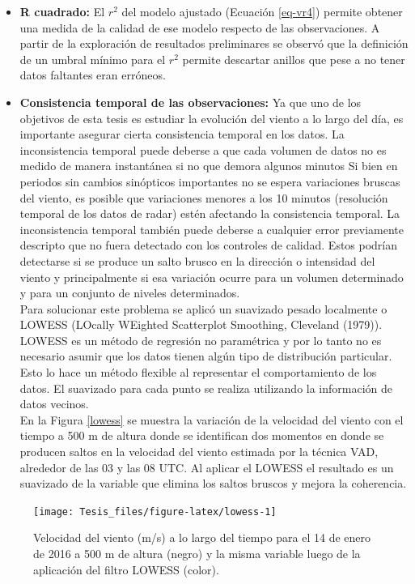 \documentclass[12pt,spanish,oneside, a4paper]{book}
\begin{document}
\begin{itemize}
\item
  \textbf{R cuadrado:} El \(r^2\) del modelo ajustado (Ecuación
  \ref{eq-vr4}) permite obtener una medida de la calidad de ese modelo
  respecto de las observaciones. A partir de la exploración de
  resultados preliminares se observó que la definición de un umbral
  mínimo para el \(r^2\) permite descartar anillos que pese a no tener
  datos faltantes eran erróneos.
\item
  \textbf{Consistencia temporal de las observaciones:} Ya que uno de los
  objetivos de esta tesis es estudiar la evolución del viento a lo largo
  del día, es importante asegurar cierta consistencia temporal en los
  datos. La inconsistencia temporal puede deberse a que cada volumen de
  datos no es medido de manera instantánea si no que demora algunos
  minutos Si bien en periodos sin cambios sinópticos importantes no se
  espera variaciones bruscas del viento, es posible que variaciones
  menores a los 10 minutos (resolución temporal de los datos de radar)
  estén afectando la consistencia temporal. La inconsistencia temporal
  también puede deberse a cualquier error previamente descripto que no
  fuera detectado con los controles de calidad. Estos podrían detectarse
  si se produce un salto brusco en la dirección o intensidad del viento
  y principalmente si esa variación ocurre para un volumen determinado y
  para un conjunto de niveles determinados.\\
  Para solucionar este problema se aplicó un suavizado pesado localmente
  o LOWESS (LOcally WEighted Scatterplot Smoothing, Cleveland (1979)).
  LOWESS es un método de regresión no paramétrica y por lo tanto no es
  necesario asumir que los datos tienen algún tipo de distribución
  particular. Esto lo hace un método flexible al representar el
  comportamiento de los datos. El suavizado para cada punto se realiza
  utilizando la información de datos vecinos.\\
  En la Figura \ref{lowess} se muestra la variación de la velocidad del
  viento con el tiempo a 500 m de altura donde se identifican dos
  momentos en donde se producen saltos en la velocidad del viento
  estimada por la técnica VAD, alrededor de las 03 y las 08 UTC. Al
  aplicar el LOWESS el resultado es un suavizado de la variable que
  elimina los saltos bruscos y mejora la coherencia.
\end{itemize}

\begin{figure}

{\centering \texttt{[image: Tesis\_files/figure-latex/lowess-1]} 

}

\caption{Velocidad del viento (m/s) a lo largo del tiempo para el 14 de enero de 2016 a 500 m de altura (negro) y la misma variable luego de la aplicación del filtro LOWESS (color). \label{lowess}}\label{fig:lowess}
\end{figure}
\end{document}
